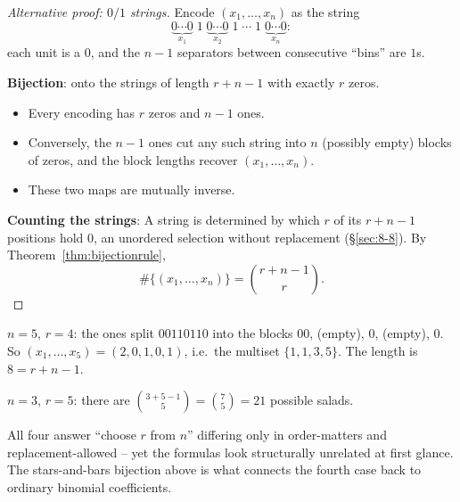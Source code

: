 \begin{proof}[Alternative proof: $0/1$ strings]
Encode $(x_1,\dots,x_n)$ as the string
\[
\underbrace{0\cdots0}_{x_1}\;1\;\underbrace{0\cdots0}_{x_2}\;1\;\cdots\;1\;\underbrace{0\cdots0}_{x_n}:
\]
each unit is a $0$, and the $n-1$ separators between consecutive ``bins'' are $1$s.

\textbf{Bijection}: onto the strings of length $r+n-1$ with exactly $r$ zeros.
\begin{itemize}
  \item Every encoding has $r$ zeros and $n-1$ ones.
  \item Conversely, the $n-1$ ones cut any such string into $n$ (possibly empty) blocks of zeros, and the block lengths recover $(x_1,\dots,x_n)$.
  \item These two maps are mutually inverse.
\end{itemize}

\textbf{Counting the strings}: A string is determined by which $r$ of its $r+n-1$ positions hold $0$, an unordered selection without replacement (\S\ref{sec:8-8}). By Theorem~\ref{thm:bijectionrule},
\[
\#\{(x_1,\dots,x_n)\} = \binom{r+n-1}{r}.
\]
\end{proof}

\begin{example}
$n=5$, $r=4$: the ones split $00110110$ into the blocks $00$, (empty), $0$, (empty), $0$. So $(x_1,\dots,x_5)=(2,0,1,0,1)$, i.e.\ the multiset $\{1,1,3,5\}$. The length is $8=r+n-1$.
\end{example}

\begin{example}
$n=3$, $r=5$: there are $\binom{3+5-1}{5}=\binom75=21$ possible salads.
\end{example}

\begin{note}
All four answer ``choose $r$ from $n$'' differing only in order-matters and replacement-allowed -- yet the formulas look structurally unrelated at first glance. The stars-and-bars bijection above is what connects the fourth case back to ordinary binomial coefficients.
\end{note}

